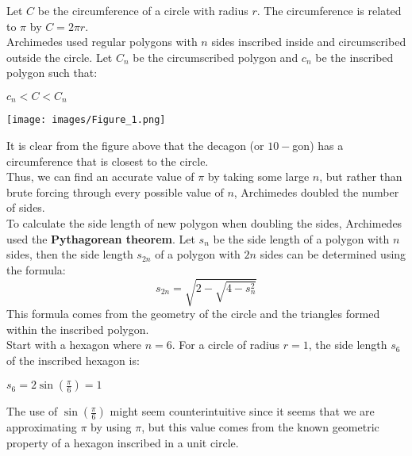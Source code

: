 \documentclass[12pt]{article}
\begin{document}
\noindent Let $C$ be the circumference of a circle with radius $r$. The circumference is related to $\pi$ by $C = 2\pi r$.\\

\noindent Archimedes used regular polygons with $n$ sides inscribed inside and circumscribed outside the circle. Let $C_n$ be the circumscribed polygon and $c_n$ be the inscribed polygon such that:
\begin{center}
    $c_n < C < C_n$
\end{center}
\begin{center}
\texttt{[image: images/Figure\_1.png]}
\end{center}
It is clear from the figure above that the decagon (or $10-$gon) has a circumference that is closest to the circle.\\

\noindent Thus, we can find an accurate value of $\pi$ by taking some large $n$, but rather than brute forcing through every possible value of $n$, Archimedes doubled the number of sides. \\

\noindent To calculate the side length of new polygon when doubling the sides, Archimedes used the \textbf{Pythagorean theorem}. Let $s_n$ be the side length of a polygon with $n$ sides, then the side length $s_{2n}$ of a polygon with $2n$ sides can be determined using the formula:
\begin{equation}
    s_{2n} = \sqrt{2-\sqrt{4-s^2_n}}
    \label{eq:doubling_formula}
\end{equation}
This formula comes from the geometry of the circle and the triangles formed within the inscribed polygon.\\

\noindent Start with a hexagon where $n = 6$. For a circle of radius $r = 1$, the side length $s_6$ of the inscribed hexagon is:
\begin{center}
    $s_6 = 2\sin(\frac{\pi}{6}) = 1$
\end{center}
The use of $\sin(\frac{\pi}{6})$ might seem counterintuitive since it seems that we are approximating $\pi$ by using $\pi$, but this value comes from the known geometric property of a hexagon inscribed in a unit circle.\\
\end{document}
